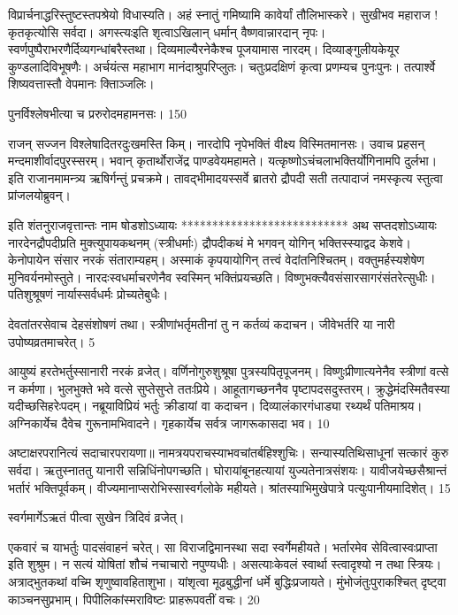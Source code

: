 विप्रार्चनाद्धरिस्तुष्टस्तपश्रेयो विधास्यति।
अहं स्नातुं गमिष्यामि कावेर्यां तौलिभास्करे।
सुखीभव महाराज ! कृतकृत्योसि सर्वदा।
अगस्त्यःइति शृत्वाऽखिलान् धर्मान् वैष्णवान्नारदान् नृपः।
स्वर्णपुष्पैराभरणैर्दिव्यगन्धांबरैस्तथा।
दिव्यमाल्यैरनेकैश्च पूजयामास नारदम्।
दिव्याङ्गुलीयकेयूर कुण्डलादिविभूषणैः।
अर्चयंत्स महाभाग मानंदाश्रुपरिप्लुतः।
चतुःप्रदक्षिणं कृत्वा प्रणम्यच पुनःपुनः।
तत्पार्श्वे शिष्यवत्तास्तौ वेपमानः क्तिाञ्जलिः।

पुनर्विश्लेषभीत्या च प्ररुरोदमहामनसः।
150

राजन् सज्जन विश्लेषादितरदुःखमस्ति किम्।
नारदोपि नृपेभक्तिं वीक्ष्य विस्मितमानसः।
उवाच प्रहसन् मन्दमाशीर्वादपुरस्सरम्।
भवान् कृतार्थोराजेंद्र पाण्डवेयमहामते।
यत्कृष्णोऽचंचलाभक्तिर्योगिनामपि दुर्लभा।
इति राजानमामन्त्र्य ऋषिर्गन्तुं प्रचक्रमे।
तावद्भीमादयस्सर्वे ब्रातरो द्रौपदी सती तत्पादाजं नमस्कृत्य स्तुत्वा प्रांजलयोब्रुवन्।

इति शंतनुराजवृत्तान्तः नाम षोडशोऽध्यायः
***************************
अथ सप्तदशोऽध्यायः नारदेनद्रौपदीप्रति मुक्त्युपायकथनम् (स्त्रीधर्माः) द्रौपदीकथं मे भगवन् योगिन् भक्तिस्स्याद्वद केशवे।
केनोपायेन संसार नरकं संताराम्यहम्।
अस्माकं कृपयायोगिन् तत्त्वं वेदांतनिश्चितम्।
वक्तुमर्हस्यशेषेण मुनिवर्यनमोस्तुते।
नारदःस्वधर्माचरणेनैव स्वस्मिन् भक्तिंप्रयच्छति।
विष्णुभक्त्यैवसंसारसागरंसंतरेत्सुधीः।
पतिशुश्रूषणं नार्यास्सर्वधर्मः प्रोच्यतेबुधैः।

देवतांतरसेवाच देहसंशोषणं तथा।
स्त्रीणांभर्तृमतीनां तु न कर्तव्यं कदाचन।
जीवेभर्तरि या नारी उपोष्यव्रतमाचरेत्।
5

आयुष्यं हरतेभर्तुस्सानारी नरकं व्रजेत्।
वर्णिनोगुरुशुश्रूषा पुत्रस्यपितृपूजनम्।
विष्णुःप्रीणात्यनेनैव स्त्रीणां वत्से न कर्मणा।
भुलभुक्ते भवे वत्से सुप्तेसुप्ते ततःप्रिये।
आहूतागच्छननैव पृष्टापदसदुस्तरम्।
क्रुद्धेमंदस्मितैवस्या यदीच्छसिहरेःपदम्।
नब्रूयाविप्रियं भर्तुः क्रीडायां वा कदाचन।
दिव्यालंकारगंधाड्या रथ्यर्थं पतिमाश्रय।
अग्निकार्येच दैवेच गुरूनामभिवादने।
गृहकार्येच सर्वत्र जागरूकासदा भव।
10

अष्टाक्षरपरानित्यं सदाचारपरायणा॥ नामत्रयपराचस्याभवचांतर्बहिश्शुचिः।
सन्यास्यतिथिसाधूनां सत्कारं कुरु सर्वदा।
ऋतुस्नाततु यानारी सन्निधिंनोपगच्छति।
घोरायांबूनहत्यायां युज्यतेनात्रसंशयः।
यावीजयेच्छसैश्रान्तं भर्तारं भक्तिपूर्वकम्।
वीज्यमानाप्सरोभिस्सास्वर्गलोके महीयते।
श्रांतस्याभिमुखेपात्रे पत्युःपानीयमादिशेत्।
15

स्वर्गमार्गेऽऋतं पीत्वा सुखेन त्रिदिवं व्रजेत्।

एकवारं च याभर्तुः पादसंवाहनं चरेत्।
सा विराजद्विमानस्था सदा स्वर्गेमहीयते।
भर्तारमेव सेवित्वास्वःप्राप्ता इति शुश्रुम।
न सत्यं योषितां शौचं नचाचारो नपुण्यधीः।
असत्याःकेवलं स्वार्था स्त्वादृश्यो न तथा स्त्रियः।
अत्राद्भुतकथां वच्मि शृणुष्वावहिताशुभा।
यांशृत्वा मूढबुद्धीनां धर्मे बुद्धिःप्रजायते।
मुंभोजंतुःपुराकश्चित् दृष्ट्वा काञ्चनसुप्रभाम्।
पिपीलिकांस्मराविष्टः प्राहरूपवतीं वचः।
20

